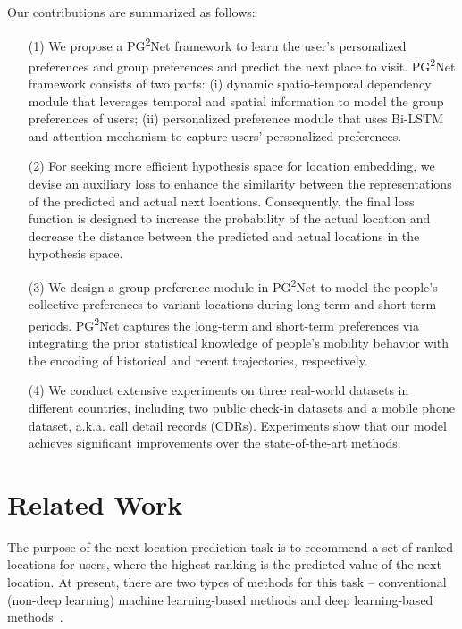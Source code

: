 \documentclass[10pt,journal,compsoc]{IEEEtran}
\begin{document}
Our contributions are summarized as follows:
\begin{enumerate}
\item[(1)] We propose a PG\textsuperscript{2}Net framework to learn the user's personalized preferences and group preferences and predict the next place to visit. PG\textsuperscript{2}Net framework consists of two parts: (i) dynamic spatio-temporal dependency module that leverages temporal and spatial information to model the group preferences of users; (ii) personalized preference module that uses Bi-LSTM and attention mechanism to capture users’ personalized preferences.

\item[(2)] For seeking more efficient hypothesis space for location embedding, we devise an auxiliary loss to enhance the similarity between the representations of the predicted and actual next locations. Consequently, the final loss function is designed to increase the probability of the actual location and decrease the distance between the predicted and actual locations in the hypothesis space.

\item[(3)] We design a group preference module in PG\textsuperscript{2}Net to model the people's collective preferences to variant locations during long-term and short-term periods. PG\textsuperscript{2}Net captures the long-term and short-term preferences via integrating the prior statistical knowledge of people's mobility behavior with the encoding of historical and recent trajectories, respectively.

\item[(4)] We conduct extensive experiments on three real-world datasets in different countries, including two public check-in datasets and a mobile phone dataset, a.k.a. call detail records (CDRs). Experiments show that our model achieves significant improvements over the state-of-the-art methods.
\end{enumerate}



\section{Related Work}

The purpose of the next location prediction task is to recommend a set of ranked locations for users, where the highest-ranking is the predicted value of the next location. At present, there are two types of methods for this task -- conventional (non-deep learning) machine learning-based methods and deep learning-based methods~\cite{feng2018deepmove}.
\end{document}
